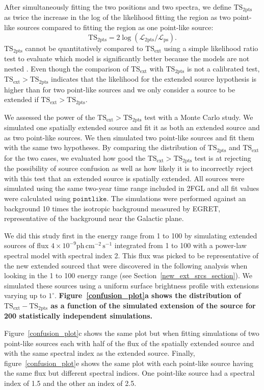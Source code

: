 \documentclass[12pt,preprint]{aastex}
\newcommand{\gev}{\text{GeV}\xspace}
\newcommand{\phflux}{\ensuremath{\text{ph}\,\text{cm}^{-2}\,\text{s}^{-1}}\xspace}
\newcommand{\tsext}{{\ensuremath{\text{TS}_{\text{ext}}}}\xspace}
\newcommand{\tsinc}{\ensuremath{\text{TS}_{\text{2pts}}}\xspace}
\newcommand{\likelihood}{\ensuremath{\mathcal{L}}\xspace}
\newcommand{\pointlike}{\ensuremath{\mathtt{pointlike}}\xspace}
\newcommand{\degree}{^\circ\xspace}
\newcommand{\newtext}[1]{{\bfseries \color{red}#1}}
\begin{document}
After simultaneously fitting the two positions and two spectra,
we define \tsinc as twice the increase in the log of the likelihood
fitting the region as two point-like sources compared to fitting the
region as one point-like source:
\begin{equation}
  \tsinc=2\log(\likelihood_\text{2pts}/\likelihood_\text{ps}).
\end{equation} 
\tsinc cannot be quantitatively compared to \tsext using a simple
likelihood ratio test to evaluate which model is significantly better
because the models are not nested \citep{statistics_with_care}.
Even though the comparison of \tsext with \tsinc is not a calibrated
test, $\tsext>\tsinc$ indicates that the likelihood for the extended
source hypothesis is higher than for two point-like sources and we only
consider a source to be extended if $\tsext>\tsinc$.

We assessed the power of the $\tsext>\tsinc$ test with a Monte Carlo
study.  We simulated one spatially extended source and fit it as both
an extended source and as two point-like sources.  We then simulated two
point-like sources and fit them with the same two hypotheses. By comparing
the distribution of \tsinc and \tsext for the two cases, we evaluated
how good the $\tsext>\tsinc$ test is at rejecting the possibility of
source confusion as well as how likely it is to incorrectly reject 
with this test that an extended source is 
spatially extended.  All sources were simulated using
the same two-year time range included in 2FGL and all fit values were
calculated using \pointlike. The simulations were performed against
an background 10 times the isotropic background measured by EGRET,
representative of the background near the Galactic plane.

We did this study first in the energy range from 1 \gev to 100 \gev by
simulating extended sources of flux $4\times10^{-9} \phflux$ integrated
from 1 \gev to 100 \gev with a power-law spectral model with
spectral index 2.  This flux was picked to be representative of the
new extended sourced that were discovered in the following analysis
when looking in the 1 \gev to 100 \gev energy range
(see Section~\ref{new_ext_srcs_section}).
We simulated these sources using a uniform surface brightness profile
with extensions varying
up to $1\degree$.  
\newtext{
Figure~\ref{confusion_plot}a shows 
the distribution of $\tsext-\tsinc$ as a
function of the simulated extension of the source
for 200 statistically independent simulations.
}


Figure~\ref{confusion_plot}c shows the same plot but when fitting
simulations of two point-like sources each with half of the flux of
the spatially extended source and with the same spectral index as the
extended source.  Finally, figure~\ref{confusion_plot}e shows the same
plot with each point-like source having the same flux but different
spectral indices.  One point-like source had a spectral index of 1.5
and the other an index of 2.5.
\end{document}
